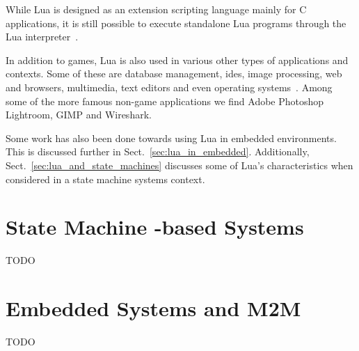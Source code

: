 While Lua is designed as an extension scripting language mainly for C applications, it is still possible to execute standalone Lua programs through the Lua interpreter~\cite[ch. 7]{manual:lua_reference_manual}.

In addition to games, Lua is also used in various other types of applications and contexts. Some of these are database management, \glspl{ide}, image processing, web and browsers, multimedia, text editors and even operating systems~\cite{website:where_lua_is_used}. Among some of the more famous non-game applications we find Adobe Photoshop Lightroom, GIMP and Wireshark.

Some work has also been done towards using Lua in embedded environments. This is discussed further in Sect.~\ref{sec:lua_in_embedded}. Additionally, Sect.~\ref{sec:lua_and_state_machines} discusses some of Lua's characteristics when considered in a state machine systems context.

\section{State Machine -based Systems}
\label{sec:state_machine_system}
TODO

\section{Embedded Systems and M2M}
\label{sec:embedded_m2m}
TODO